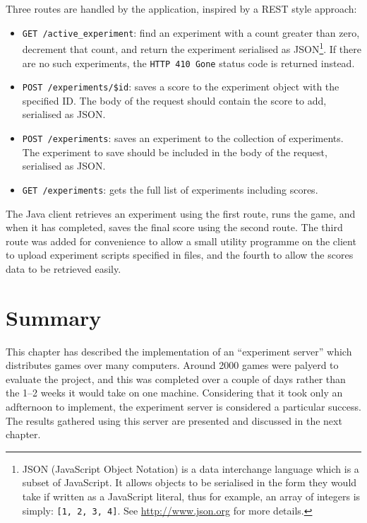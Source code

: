 Three routes are handled by the application, inspired by a REST style approach:

\begin{itemize}
\item {\tt GET /active\_experiment}: find an experiment with a count greater than zero, decrement that count, and return the experiment serialised as JSON\footnote{JSON (JavaScript Object Notation) is a data interchange language which is a subset of JavaScript.  It allows objects to be serialised in the form they would take if written as a JavaScript literal, thus for example, an array of integers is simply: {\tt [1, 2, 3, 4]}.  See \url{http://www.json.org} for more details.}.  If there are no such experiments, the {\tt HTTP 410 Gone} status code is returned instead.
\item {\tt POST /experiments/\$id}: saves a score to the experiment object with the specified ID.  The body of the request should contain the score to add, serialised as JSON.
\item {\tt POST /experiments}: saves an experiment to the collection of experiments.  The experiment to save should be included in the body of the request, serialised as JSON.
\item {\tt GET /experiments}: gets the full list of experiments including scores.
\end{itemize}

The Java client retrieves an experiment using the first route, runs the game, and when it has completed, saves the final score using the second route.  The third route was added for convenience to allow a small utility programme on the client to upload experiment scripts specified in files, and the fourth to allow the scores data to be retrieved easily.

\section{Summary}

This chapter has described the implementation of an ``experiment server'' which distributes games over many computers.  Around 2000 games were palyerd to evaluate the project, and this was completed over a couple of days rather than the 1--2 weeks it would take on one machine.  Considering that it took only an adfternoon to implement, the experiment server is considered a particular success.  The results gathered using this server are presented and discussed in the next chapter.



